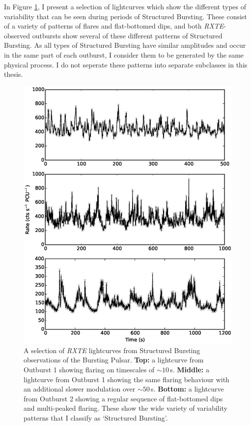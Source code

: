 \par In Figure \ref{fig:Types_Struc}, I present a selection of lightcurves which show the different types of variability that can be seen during periods of Structured Bursting.  These consist of a variety of patterns of flares and flat-bottomed dips, and both \indexrxte\textit{RXTE}-observed outbursts show several of these different patterns of Structured Bursting.  As all types of Structured Bursting have similar amplitudes and occur in the same part of each outburst, I consider them to be generated by the same physical process.  I do not seperate these patterns into separate subclasses in this thesis.

\begin{figure}
  \centering
  \includegraphics[width=.9\linewidth, trim={0.8cm 0 1.5cm 0},clip]{images/many_struc.eps}
  \caption[A selection of \textit{RXTE} lightcurves from Structured Bursting observations of the Bursting Pulsar.]{\small A selection of \indexrxte\textit{RXTE} lightcurves from Structured Bursting observations of the Bursting Pulsar.  \textbf{Top:} a lightcurve from Outburst 1 showing flaring on timescales of $\sim10$\,s.  \textbf{Middle:} a lightcurve from Outburst 1 showing the same flaring behaviour with an additional slower modulation over $\sim50$\,s.  \textbf{Bottom:} a lightcurve from Outburst 2 showing a regular sequence of flat-bottomed dips and multi-peaked flaring.  These show the wide variety of variability patterns that I classify as `Structured Bursting'.}
  \label{fig:Types_Struc}
\end{figure}

